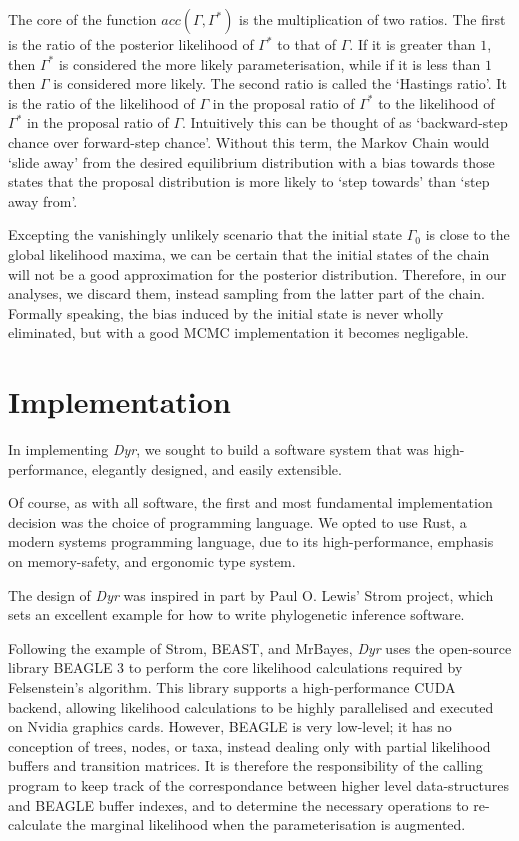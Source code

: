 \documentclass[10pt,journal,compsoc]{IEEEtran}
\begin{document}
The core of the function $acc(\Gamma, \Gamma^*)$ is the multiplication of two ratios. The first is the ratio of the posterior likelihood of $\Gamma^*$ to that of $\Gamma$. If it is greater than $1$, then $\Gamma^*$ is considered the more likely parameterisation, while if it is less than $1$ then $\Gamma$ is considered more likely. The second ratio is called the `Hastings ratio'. It is the ratio of the likelihood of $\Gamma$ in the proposal ratio of $\Gamma^*$ to the likelihood of $\Gamma^*$ in the proposal ratio of $\Gamma$. Intuitively this can be thought of as `backward-step chance over forward-step chance'. Without this term, the Markov Chain would `slide away' from the desired equilibrium distribution with a bias towards those states that the proposal distribution is more likely to `step towards' than `step away from'.

Excepting the vanishingly unlikely scenario that the initial state $\Gamma_0$ is close to the global likelihood maxima, we can be certain that the initial states of the chain will not be a good approximation for the posterior distribution. Therefore, in our analyses, we discard them, instead sampling from the latter part of the chain. Formally speaking, the bias induced by the initial state is never wholly eliminated, but with a good MCMC implementation it becomes negligable.

\section{Implementation}\label{sec:implementation}

In implementing \textit{Dyr}, we sought to build a software system that was high-performance, elegantly designed, and easily extensible.

Of course, as with all software, the first and most fundamental implementation decision was the choice of programming language. We opted to use Rust, a modern systems programming language, due to its high-performance, emphasis on memory-safety, and ergonomic type system.

The design of \textit{Dyr} was inspired in part by Paul O. Lewis' Strom project, which sets an excellent example for how to write phylogenetic inference software.

Following the example of Strom, BEAST, and MrBayes, \textit{Dyr} uses the open-source library BEAGLE 3 to perform the core likelihood calculations required by Felsenstein's algorithm. This library supports a high-performance CUDA backend, allowing likelihood calculations to be highly parallelised and executed on Nvidia graphics cards. However, BEAGLE is very low-level; it has no conception of trees, nodes, or taxa, instead dealing only with partial likelihood buffers and transition matrices. It is therefore the responsibility of the calling program to keep track of the correspondance between higher level data-structures and BEAGLE buffer indexes, and to determine the necessary operations to re-calculate the marginal likelihood when the parameterisation is augmented.
\end{document}
